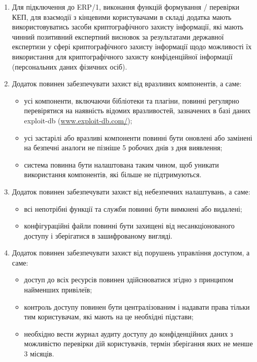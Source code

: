 \documentclass{article}
\begin{document}
\begin{enumerate}
  \item Для підключення до ERP/1, виконання функцій формування / перевірки КЕП, для взаємодії з кінцевими
        користувачами в складі додатка мають використовуватись засоби криптографічного захисту інформації,
        які мають чинний позитивний експертний висновок за результатами державної експертизи у сфері
        криптографічного захисту інформації щодо можливості їх використання для криптографічного захисту
        конфіденційної інформації (персональних даних фізичних осіб).

  \item Додаток повинен забезпечувати захист від вразливих компонентів, а саме:
    \begin{itemize}
      \item усі компоненти, включаючи бібліотеки та плагіни, повинні регулярно
            перевірятися на наявність відомих вразливостей, зазначених в базі даних exploit-db (\url{www.exploit-db.com/});
      \item усі застарілі або вразливі компоненти повинні бути оновлені або замінені на безпечні аналоги не пізніше 5 робочих днів з дня виявлення;
      \item система повинна бути налаштована таким чином, щоб уникати використання компонентів, які більше не підтримуються.
    \end{itemize}

  \item Додаток повинен забезпечувати захист від небезпечних налаштувань, а саме:
    \begin{itemize}
      \item всі непотрібні функції та служби повинні бути вимкнені або видалені;
      \item конфігураційні файли повинні бути захищені від несанкціонованого доступу і зберігатися в зашифрованому вигляді.
    \end{itemize}

  \item Додаток повинен забезпечувати захист від порушень управління доступом, а саме:
    \begin{itemize}
      \item доступ до всіх ресурсів повинен здійснюватися згідно з принципом найменших привілеїв;
      \item контроль доступу повинен бути централізованим і надавати права тільки тим користувачам, які мають на це необхідні підстави;
      \item необхідно вести журнал аудиту доступу до конфіденційних даних з можливістю перевірки дій користувачів, термін зберігання яких не менше 3 місяців.
    \end{itemize}


\end{enumerate}
\end{document}
